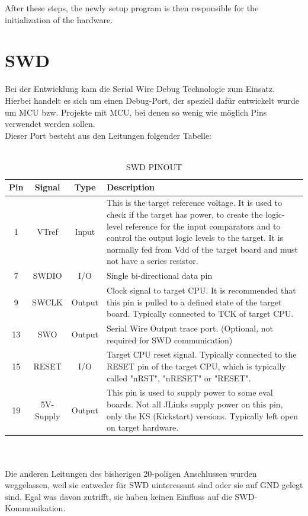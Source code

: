 After these steps, the newly setup program is then responsible for the initialization 
of the hardware.\\

\section{SWD}
Bei der Entwicklung kam die Serial Wire Debug Technologie zum Einsatz. Hierbei 
handelt es sich um einen Debug-Port, der speziell daf\"ur entwickelt wurde
 um MCU bzw. Projekte mit MCU, bei denen so wenig wie m\"oglich Pins verwendet
 werden sollen. \\
Dieser Port besteht aus den Leitungen folgender Tabelle:\\\\
\begin{table}
\caption{SWD PINOUT}
\begin{tabular}{|c|c|c|p{10cm}|}
\hline \hline
	Pin & Signal & Type & Description \\ \hline
1 & VTref & Input & This is the target reference voltage. It is used to
 check if the target has power, to create the logic-level reference for
 the input comparators and to control the output logic levels to the target.
 It is normally fed from Vdd of the target board and must not have a series resistor.\\ \hline
7 & SWDIO & I/O & Single bi-directional data pin\\ \hline
9 & SWCLK & Output & Clock signal to target CPU. It is recommended that
 this pin is pulled to a defined state of the target board. Typically
 connected to TCK of target CPU.\\ \hline
13 & SWO & Output & Serial Wire Output trace port. (Optional, not required
for SWD communication)\\ \hline
15 & RESET & I/O & Target CPU reset signal. Typically connected to the
 RESET pin of the target CPU, which is typically called "nRST", "nRESET"
 or "RESET".\\ \hline
19 & 5V-Supply & Output & This pin is used to supply power to some eval boards.
Not all JLinks supply power on this pin, only the KS (Kickstart) versions.
Typically left open on target hardware.\\ \hline
\end{tabular}
\end{table}\\\\

Die anderen Leitungen des bisherigen 20-poligen Anschlussen wurden weggelassen,
weil sie entweder f\"ur SWD uinteressant sind oder sie auf GND gelegt sind. Egal
was davon zutrifft, sie haben keinen Einfluss auf die SWD-Kommunikation.


